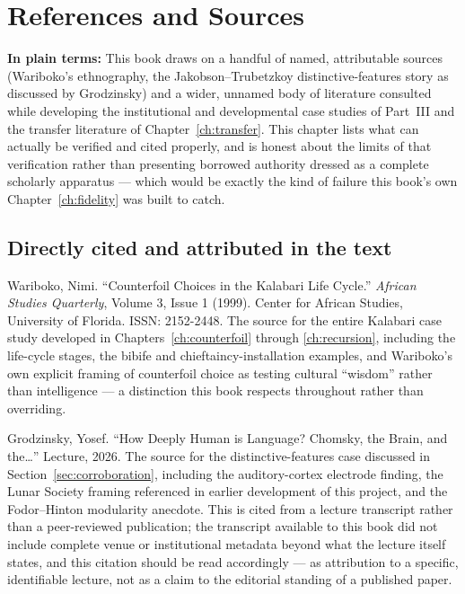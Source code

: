 \chapter*{References and Sources}

\begin{plainlanguage}
\textbf{In plain terms:} This book draws on a handful of named, attributable sources (Wariboko's ethnography, the Jakobson--Trubetzkoy distinctive-features story as discussed by Grodzinsky) and a wider, unnamed body of literature consulted while developing the institutional and developmental case studies of Part~III and the transfer literature of Chapter~\ref{ch:transfer}. This chapter lists what can actually be verified and cited properly, and is honest about the limits of that verification rather than presenting borrowed authority dressed as a complete scholarly apparatus --- which would be exactly the kind of failure this book's own Chapter~\ref{ch:fidelity} was built to catch.
\end{plainlanguage}

\section*{Directly cited and attributed in the text}

Wariboko, Nimi. ``Counterfoil Choices in the Kalabari Life Cycle.'' \emph{African Studies Quarterly}, Volume 3, Issue 1 (1999). Center for African Studies, University of Florida. ISSN: 2152-2448. The source for the entire Kalabari case study developed in Chapters~\ref{ch:counterfoil} through \ref{ch:recursion}, including the life-cycle stages, the bibife and chieftaincy-installation examples, and Wariboko's own explicit framing of counterfoil choice as testing cultural ``wisdom'' rather than intelligence --- a distinction this book respects throughout rather than overriding.

Grodzinsky, Yosef. ``How Deeply Human is Language? Chomsky, the Brain, and the\ldots'' Lecture, 2026. The source for the distinctive-features case discussed in Section~\ref{sec:corroboration}, including the auditory-cortex electrode finding, the Lunar Society framing referenced in earlier development of this project, and the Fodor--Hinton modularity anecdote. This is cited from a lecture transcript rather than a peer-reviewed publication; the transcript available to this book did not include complete venue or institutional metadata beyond what the lecture itself states, and this citation should be read accordingly --- as attribution to a specific, identifiable lecture, not as a claim to the editorial standing of a published paper.

